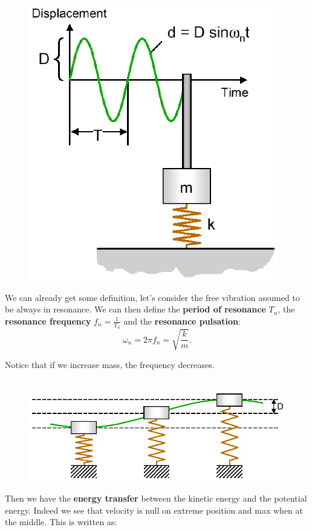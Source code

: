 			\begin{figure}
			\vspace{-8mm}
			\includegraphics[scale=0.35]{vibration/ch1/2}
			\end{figure}		
			We can already get some definition, let's consider the free vibration assumed to be always in resonance. We can then define the \textbf{period of resonance} $T_n$, the \textbf{resonance frequency} $f_n = \frac{1}{T_n}$ and the \textbf{resonance pulsation}:
			\begin{equation}
			\omega _n = 2\pi f_n = \sqrt{\frac{k}{m}}.
			\end{equation}
			
			Notice that if we increase mass, the frequency decreases. 
			\\\\
			
			\begin{figure}
			\vspace{-5mm}
			\includegraphics[scale=0.3]{vibration/ch1/3}
			\end{figure}
			Then we have the \textbf{energy transfer} between the kinetic energy and the potential energy. Indeed we see that velocity is null on extreme position and max when at the middle. This is written as:
			
